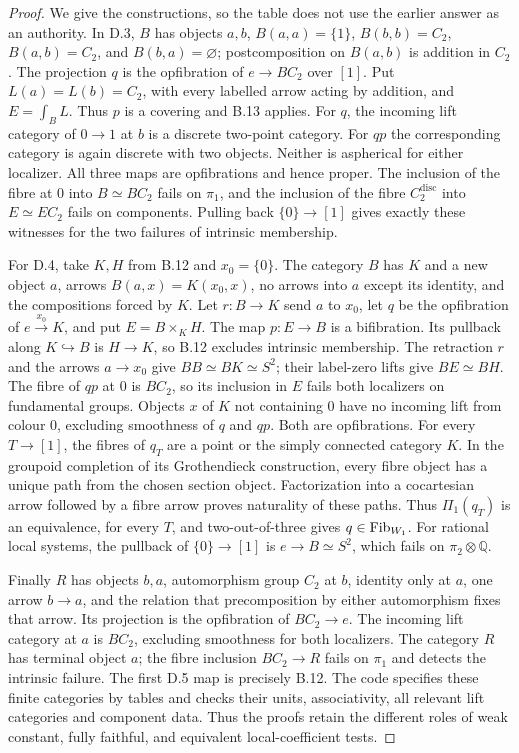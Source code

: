 \begin{proof}
We give the constructions, so the table does not use the earlier answer as
an authority. In D.3, $B$ has objects $a,b$, $B(a,a)=\{1\}$,
$B(b,b)=C_2$, $B(a,b)=C_2$, and $B(b,a)=\varnothing$; postcomposition
on $B(a,b)$ is addition in $C_2$. The projection $q$ is the opfibration
of $e\to BC_2$ over $[1]$. Put $L(a)=L(b)=C_2$, with every labelled
arrow acting by addition, and $E=\int_B L$. Thus $p$ is a covering and
B.13 applies. For $q$, the incoming lift category of $0\to1$ at $b$ is
a discrete two-point category. For $qp$ the corresponding category is
again discrete with two objects. Neither is aspherical for either localizer.
All three maps are opfibrations and hence proper. The inclusion of the
fibre at $0$ into $B\simeq BC_2$ fails on $\pi_1$, and the inclusion
of the fibre $C_2^{\mathrm{disc}}$ into $E\simeq EC_2$ fails on
components. Pulling back $\{0\}\to[1]$ gives exactly these witnesses
for the two failures of intrinsic membership.

For D.4, take $K,H$ from B.12 and $x_0=\{0\}$. The category $B$ has
$K$ and a new object $a$, arrows $B(a,x)=K(x_0,x)$, no arrows into $a$
except its identity, and the compositions forced by $K$. Let
$r:B\to K$ send $a$ to $x_0$, let $q$ be the opfibration of
$e\xrightarrow{x_0}K$, and put $E=B\times_KH$. The map $p:E\to B$
is a bifibration. Its pullback along $K\hookrightarrow B$ is $H\to K$,
so B.12 excludes intrinsic membership. The retraction $r$ and the arrows
$a\to x_0$ give $BB\simeq BK\simeq S^2$; their label-zero lifts give
$BE\simeq BH$. The fibre of $qp$ at $0$ is $BC_2$, so its inclusion in
$E$ fails both localizers on fundamental groups. Objects $x$ of $K$ not
containing $0$ have no incoming lift from colour $0$, excluding smoothness
of $q$ and $qp$. Both are opfibrations.
For every $T\to[1]$, the fibres of $q_T$ are a point or the simply connected
category $K$. In the groupoid completion of its Grothendieck construction,
every fibre object has a unique path from the chosen section object.
Factorization into a cocartesian arrow followed by a fibre arrow proves
naturality of these paths. Thus $\Pi_1(q_T)$ is an equivalence, for every
$T$, and two-out-of-three gives $q\in\mathrm{Fib}_{W_1}$.
For rational local systems, the pullback of $\{0\}\to[1]$ is
$e\to B\simeq S^2$, which fails on $\pi_2\otimes\mathbb Q$.

Finally $R$ has objects $b,a$, automorphism group $C_2$ at $b$, identity
only at $a$, one arrow $b\to a$, and the relation that precomposition
by either automorphism fixes that arrow. Its projection is the opfibration
of $BC_2\to e$. The incoming lift category at $a$ is $BC_2$, excluding
smoothness for both localizers. The category $R$ has terminal object $a$;
the fibre inclusion $BC_2\to R$ fails on $\pi_1$ and detects the
intrinsic failure. The first D.5 map is precisely B.12.
The code specifies these finite categories by tables and checks their units,
associativity, all relevant lift categories and component data. Thus the
proofs retain the different roles of weak constant, fully faithful, and
equivalent local-coefficient tests.
\end{proof}

